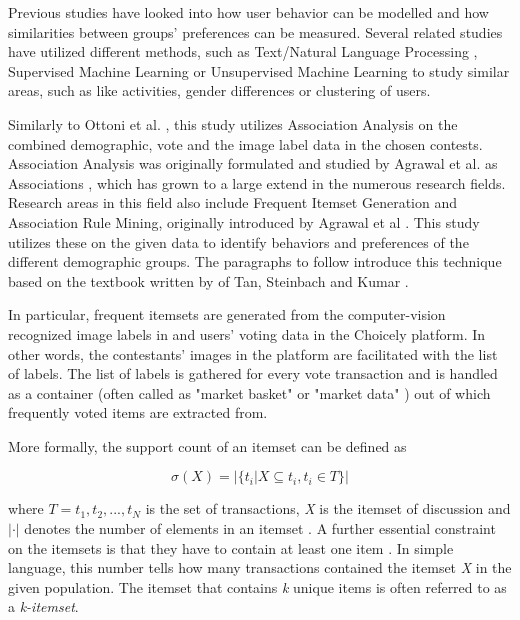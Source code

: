 Previous studies have looked into how user behavior can be modelled and how similarities between groups' preferences can be measured. Several related studies have utilized different methods, such as Text/Natural Language Processing \cite{ottoni2013ladies, farseev2015harvestingmultiplesources, jang2016teensengagemorewithfewerphotos, kabinsingha2012movie, han2016teensarefrommars}, Supervised Machine Learning \cite{chinesemobilebankingusers, saraee2004data, kabinsingha2012movie, farseev2015harvestingmultiplesources, han2016teensarefrommars, jang2015no, bakhshi2014faces} or Unsupervised Machine Learning \cite{saraee2004data, hu2014we, jang2015no} to study similar areas, such as like activities, gender differences or clustering of users. 

Similarly to Ottoni et al. \cite{ottoni2013ladies}, this study utilizes Association Analysis on the combined demographic, vote and the image label data in the chosen contests. Association Analysis was originally formulated and studied by Agrawal et al. as Associations \cite{database_mining_agrawal, mining_association_rules_agrawal}, which has grown to a large extend in the numerous research fields. Research areas in this field also include Frequent Itemset Generation and Association Rule Mining, originally introduced by Agrawal et al \cite{mining_association_rules_agrawal}. This study utilizes these on the given data to identify behaviors and preferences of the different demographic groups. The paragraphs to follow introduce this technique based on the textbook written by of Tan, Steinbach and Kumar \cite{introtodatamining}.

In particular, frequent itemsets are generated from the computer-vision recognized image labels in and users' voting data in the Choicely platform. In other words, the contestants' images in the platform are facilitated with the list of labels. The list of labels is gathered for every vote transaction and is handled as a container (often called as "market basket" or "market data" \cite{Brin97dynamicitemset, Brin1997BeyondMB, Raeder2010MarketBA}) out of which frequently voted items are extracted from. 

More formally, the support count of an itemset can be defined as

\begin{equation}
    \sigma (X) = |\{ t_i | X \subseteq t_i, t_i \in T \}|
\end{equation}

where $T = {t_1, t_2, ..., t_N}$ is the set of transactions, \emph{X} is the itemset of discussion and $| \cdot |$ denotes the number of elements in an itemset \cite{introtodatamining}. A further essential constraint on the itemsets is that they have to contain at least one item \cite{introtodatamining}. In simple language, this number tells how many transactions contained the itemset \emph{X} in the given population. The itemset that contains \emph{k} unique items is often referred to as a \emph{k-itemset}. 

